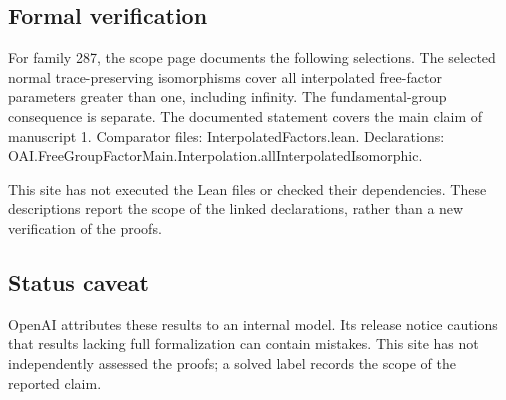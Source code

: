 \documentclass[11pt]{article}
\begin{document}
\subsection{Formal verification}
For family 287, the scope page documents the following selections. The selected normal trace-preserving isomorphisms cover all interpolated free-factor parameters greater than one, including infinity. The fundamental-group consequence is separate. The documented statement covers the main claim of manuscript 1. Comparator files: InterpolatedFactors.lean. Declarations: OAI.FreeGroupFactorMain.Interpolation.allInterpolatedIsomorphic.

This site has not executed the Lean files or checked their dependencies. These descriptions report the scope of the linked declarations, rather than a new verification of the proofs.

\subsection{Status caveat}
OpenAI attributes these results to an internal model. Its release notice cautions that results lacking full formalization can contain mistakes. This site has not independently assessed the proofs; a solved label records the scope of the reported claim.
\end{document}
